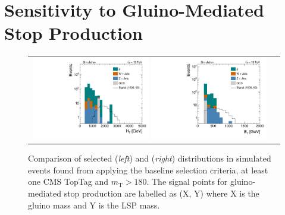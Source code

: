 \section{Sensitivity to Gluino-Mediated Stop Production}
\label{sec:stop_gluinos}
\begin{figure}[!t]
  \centering
  \begin{tabular}{cc}
   
      \includegraphics[width=0.49\textwidth]{figures/Stop_TopTagTransverseMass_HThad_GluinoT1tttt.pdf}  
      \includegraphics[width=0.49\textwidth]{figures/Stop_TopTagTransverseMass_MET_GluinoT1tttt.pdf} 
    \end{tabular}
 
  \caption{Comparison of selected \HT (\textit{left}) and \met (\textit{right}) distributions in simulated events found from applying the baseline selection criteria, at least one CMS TopTag and $m_\mathrm{T} > 180$\gev. The signal points for gluino-mediated stop production are labelled as (X, Y) where X is the gluino mass and Y is the LSP mass.}
  \label{fig:stop_gluinos_ht_met}
\end{figure}
